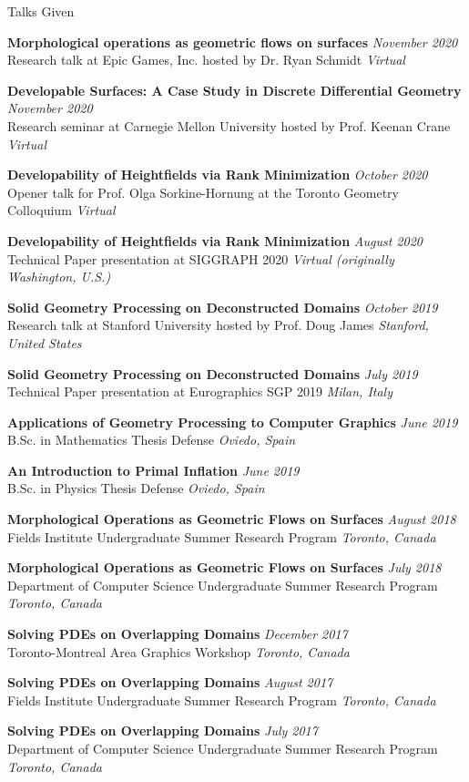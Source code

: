 \documentclass{resume}
\newcommand{\talk}[4]{
    {\bf #1} \hfill {\em \small #2} \\ %
    {\small #3} \hfill {\em \small #4}
}
\begin{document}
\begin{rSection}{Talks Given}
\talk{Morphological operations as geometric flows on surfaces}{November 2020}
{Research talk at Epic Games, Inc. hosted by Dr. Ryan Schmidt}{Virtual}

\talk{Developable Surfaces: A Case Study in Discrete Differential Geometry}{November 2020}
{Research seminar at Carnegie Mellon University hosted by Prof. Keenan Crane}{Virtual}

\talk{Developability of Heightfields via Rank Minimization}{October 2020}
{Opener talk for Prof. Olga Sorkine-Hornung at the Toronto Geometry Colloquium}{Virtual}

\talk{Developability of Heightfields via Rank Minimization}{August 2020}
{Technical Paper presentation at SIGGRAPH 2020}{Virtual (originally Washington, U.S.)}

\talk{Solid Geometry Processing on Deconstructed Domains}{October 2019}
{Research talk at Stanford University hosted by Prof. Doug James}{Stanford, United States}

\talk{Solid Geometry Processing on Deconstructed Domains}{July 2019}
{Technical Paper presentation at Eurographics SGP 2019}{Milan, Italy}

\talk{Applications of Geometry Processing to Computer Graphics}{June 2019}
{B.Sc. in Mathematics Thesis Defense}{Oviedo, Spain}

\talk{An Introduction to Primal Inflation}{June 2019}
{B.Sc. in Physics Thesis Defense}{Oviedo, Spain}

\talk{Morphological Operations as Geometric Flows on Surfaces}{August 2018}
{Fields Institute Undergraduate Summer Research Program}{Toronto, Canada}

\talk{Morphological Operations as Geometric Flows on Surfaces}{July 2018}
{Department of Computer Science Undergraduate Summer Research Program}{Toronto, Canada}

\talk{Solving PDEs on Overlapping Domains}{December 2017}
{Toronto-Montreal Area Graphics Workshop}{Toronto, Canada}

\talk{Solving PDEs on Overlapping Domains}{August 2017}
{Fields Institute Undergraduate Summer Research Program}{Toronto, Canada}

\talk{Solving PDEs on Overlapping Domains}{July 2017}
{Department of Computer Science Undergraduate Summer Research Program}{Toronto, Canada}

\end{rSection}
\end{document}
